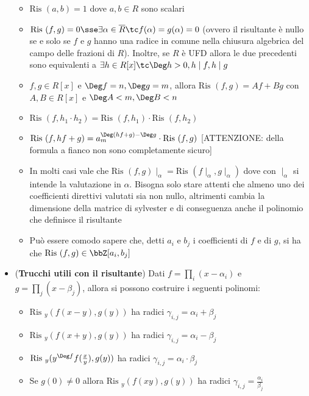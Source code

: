 \documentclass[a4paper,NoNotes,GeneralMath]{stdmdoc}
\newcommand{\Ris}{\text{Ris }}
\begin{document}
\begin{itemize}
\begin{itemize}
				\item $\Ris(a, b) = 1$ dove $a, b \in R$ sono scalari
				\item $\Ris(f, g) = 0 \sse \exists \alpha \in \overline{R} \tc f(\alpha) = g(\alpha) = 0$ (ovvero il risultante è nullo se e solo se $f$ e $g$ hanno una radice in comune nella chiusura algebrica del campo delle frazioni di $R$). Inoltre, se $R$ è UFD allora le due precedenti sono equivalenti a $\exists h \in R[x] \tc \Deg h > 0, h \mid f, h \mid g$
				\item $f, g \in R[x]$ e $\Deg f = n, \Deg g = m$, allora $\Ris(f,g) = Af + Bg$ con $A, B \in R[x]$ e $\Deg A < m, \Deg B < n$
				\item $\Ris(f, h_1 \cdot h_2) = \Ris(f, h_1) \cdot \Ris(f, h_2)$
				\item $\Ris(f, hf+g) = a_m^{\Deg (hf + g) - \Deg g} \cdot \Ris(f, g)$ [ATTENZIONE: della formula a fianco non sono completamente sicuro]
				\item In molti casi vale che $\Ris(f,g) \mid_\alpha = \Ris(f\mid_\alpha, g\mid_\alpha)$ dove con $\mid_\alpha$ si intende la valutazione in $\alpha$. Bisogna solo stare attenti che almeno uno dei coefficienti direttivi valutati sia non nullo, altrimenti cambia la dimensione della matrice di sylvester e di conseguenza anche il polinomio che definisce il risultante
				\item Può essere comodo sapere che, detti $a_i$ e $b_j$ i coefficienti di $f$ e di $g$, si ha che $\Ris(f, g) \in \bbZ[a_i, b_j]$
			\end{itemize}
		\item ({\bf Trucchi utili con il risultante}) Dati $f = \prod_i (x - \alpha_i)$ e $g = \prod_j (x - \beta_j)$, allora si possono costruire i seguenti polinomi:
			\begin{itemize}
				\item $\Ris_y (f(x-y), g(y))$ ha radici $\gamma_{i,j} = \alpha_i + \beta_j$
				\item $\Ris_y (f(x+y), g(y))$ ha radici $\gamma_{i,j} = \alpha_i - \beta_j$
				\item $\Ris_y (y^{\Deg f} f(\frac{x}{y}), g(y))$ ha radici $\gamma_{i,j} = \alpha_i \cdot \beta_j$
				\item Se $g(0) \neq 0$ allora $\Ris_y (f(xy), g(y))$ ha radici $\gamma_{i,j} = \frac{\alpha_i}{\beta_j}$
			\end{itemize}
	\end{itemize}
	
\end{document}
